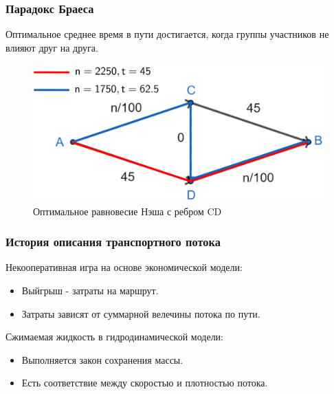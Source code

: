 \documentclass{beamer}
\begin{document}
\begin{frame}\frametitle{Парадокс Браеса}
	Оптимальное среднее время в пути достигается, когда группы участников не влияют друг на друга.
	\begin{figure}[H]
	\begin{center}
		\begin{minipage}[h]{0.60\linewidth}
			\includegraphics[width=1\linewidth]{imgs/braess_after_opt_short.png}
			\caption{Оптимальное равновесие Нэша с ребром CD}
			\label{ris:braess_3}
		\end{minipage}
	\end{center}
\end{figure}
\end{frame}

\begin{frame}\frametitle{История описания транспортного потока}
	Некооперативная игра на основе экономической модели:
	\begin{itemize}
		\item Выйгрыш - затраты на маршрут.
		
		\item Затраты зависят от суммарной велечины потока по пути. 
	\end{itemize}

	\bigskip

	Сжимаемая жидкость в гидродинамической модели:
	\begin{itemize}
		\item Выполняется закон сохранения массы.
		
		\item Есть соответствие между скоростью и плотностью потока.
	\end{itemize}
\end{frame}
\end{document}
